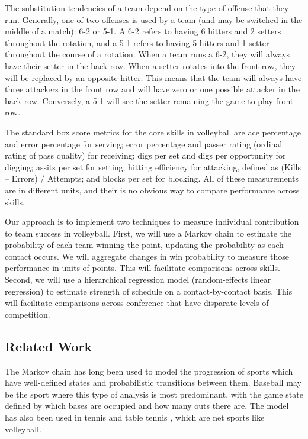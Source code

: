 \documentclass{article}
\begin{document}
The substitution tendencies of a team depend on the type of offense that they run. Generally, one of two offenses is used by a team (and may be switched in the middle of a match): 6-2 or 5-1. A 6-2 refers to having 6 hitters and 2 setters throughout the rotation, and a 5-1 refers to having 5 hitters and 1 setter throughout the course of a rotation. When a team runs a 6-2, they will always have their setter in the back row. When a setter rotates into the front row, they will be replaced by an opposite hitter. This means that the team will always have three attackers in the front row and will have zero or one possible attacker in the back row. Conversely, a 5-1 will see the setter remaining the game to play front row.

The standard box score metrics for the core skills in volleyball are ace percentage and error percentage for serving; error percentage and passer rating (ordinal rating of pass quality) for receiving; digs per set and digs per opportunity for digging; assits per set for setting; hitting efficiency for attacking, defined as (Kills -- Errors) / Attempts; and blocks per set for blocking. All of these measurements are in different units, and their is no obvious way to compare performance across skills.

Our approach is to implement two techniques to measure individual contribution to team success in volleyball. First, we will use a Markov chain to estimate the probability of each team winning the point, updating the probability as each contact occurs. We will aggregate changes in win probability to measure those performance in units of points. This will facilitate comparisons across skills. Second, we will use a hierarchical regression model (random-effects linear regression) to estimate strength of schedule on a contact-by-contact basis. This will facilitate comparisons across conference that have disparate levels of competition.


\subsection{Related Work}
\label{sec:related-work}

The Markov chain has long been used to model the progression of sports which have well-defined states and probabilistic transitions between them. Baseball \citep{bukiet_etal_1997} may be the sport where this type of analysis is most predominant, with the game state defined by which bases are occupied and how many outs there are. The model has also been used in tennis \citep{newton_etal_2009} and table tennis \citep{pfeiffer_etal_2010}, which are net sports like volleyball.
\end{document}
